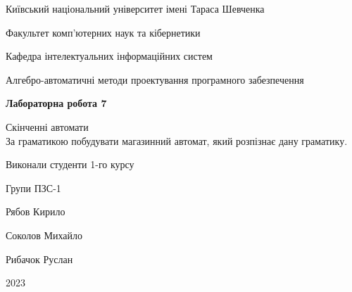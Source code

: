 \documentclass[12pt,a4paper]{article}
\begin{document}
\begin{titlepage}
    \centering
    \vspace*{1cm}
    
    \Large
    Київський національний університет імені Тараса Шевченка \\
    
    \vspace{0.5cm}
    
    \large
    Факультет комп'ютерних наук та кібернетики \\
    
    \vspace{0.5cm}
    
    Кафедра інтелектуальних інформаційних систем \\
    
    \vspace{0.5cm}
    
    Алгебро-автоматичні методи проектування програмного забезпечення \\
    
    \vspace{3cm}
    
    \textbf{Лабораторна робота 7} \\
    
    \vspace{0.5cm}
    
    Скінченні автомати \\
    За граматикою побудувати магазинний автомат, який розпізнає дану граматику.
    
    \vspace{2cm}
    
    Виконали студенти 1-го курсу \\

    \vspace{0.2cm}
    
    Групи ПЗС-1 \\

    \vspace{0.1cm}
    
    Рябов Кирило \\

    \vspace{0.1cm}
    
    Соколов Михайло \\

    \vspace{0.1cm}
    
    Рибачок Руслан \\
    
    \vfill
    
    2023
    
\end{titlepage}
\end{document}
